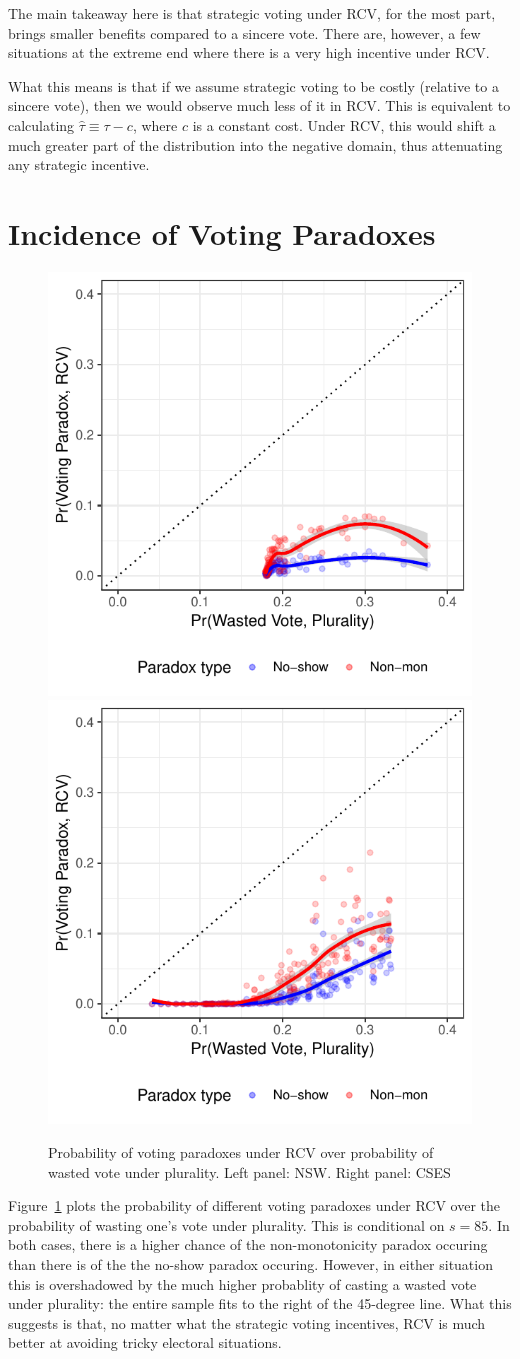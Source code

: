 \documentclass[11pt, letter, margin = 2 in]{article}
\begin{document}
The main takeaway here is that strategic voting under RCV, for the most part, brings smaller benefits compared to a sincere vote. There are, however, a few situations at the extreme end where there is a very high incentive under RCV.

What this means is that if we assume strategic voting to be costly (relative to a sincere vote), then we would observe much less of it in RCV. This is equivalent to calculating $\hat{\tau} \equiv \tau - c$, where $c$ is a constant cost. Under RCV, this would shift a much greater part of the distribution into the negative domain, thus attenuating any strategic incentive.

\section{Incidence of Voting Paradoxes}

\begin{figure}[!h]
	\centering
	\includegraphics[width = .45 \textwidth]{"../output/figures/paradoxes_aus"}
	\includegraphics[width = .45 \textwidth]{"../output/figures/paradoxes_cses"}
	\caption{Probability of voting paradoxes under RCV over probability of wasted vote under plurality. Left panel: NSW. Right panel: CSES}
	\label{fig:paradox}
\end{figure}

Figure~\ref{fig:paradox} plots the probability of different voting paradoxes under RCV over the probability of wasting one's vote under plurality. This is conditional on $s = 85$. In both cases, there is a higher chance of the non-monotonicity paradox occuring than there is of the the no-show paradox occuring. However, in either situation this is overshadowed by the much higher probablity of casting a wasted vote under plurality: the entire sample fits to the right of the 45-degree line. What this suggests is that, no matter what the strategic voting incentives, RCV is much better at avoiding tricky electoral situations.
\end{document}
